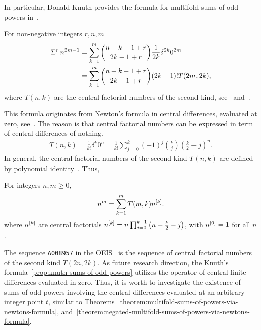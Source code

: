 In particular, Donald Knuth provides the formula for multifold sums of
odd powers in~\cite{knuth1993johann}.
\begin{proposition}
  For non-negative integers $r,n,m$
  \label{prop:knuth-sums-of-odd-powers}
  \begin{align*}
    \Sigma^{r}\,{n}^{2m-1}
    &= \sum_{k=1}^{m} \binom{n+k-1+r}{2k-1+r} \frac{1}{2k} \delta^{2k} 0^{2m} \\
    &= \sum_{k=1}^{m} \binom{n+k-1+r}{2k-1+r} (2k-1)! T(2m, 2k),
  \end{align*}
  where $T(n,k)$ are the central factorial numbers of the second
  kind, see~\cite[section 58]{steffensen1927interpolation}
  and~\cite[formula (10a)]{carlitz1963divided}.
\end{proposition}
This formula originates from Newton's formula in central differences,
evaluated at zero, see~\cite{kolosov_2025_18098442}.
The reason is that central factorial numbers can be expressed in
term of central differences of nothing.
\begin{align*}
  T(n, k) = \frac{1}{k!} \delta^k 0^n = \frac{1}{k!}
  \sum_{j=0}^{k} (-1)^j \binom{k}{j} \left( \frac{k}{2} - j \right)^n.
\end{align*}
In general, the
central factorial numbers of the second kind $T(n,k)$ are defined by polynomial
identity~\cite[ch. 6.5, formula (24)]{riordan1968combinatorial}.
Thus,
\begin{lemma} 
  For integers $n,m \geq 0$,
  \begin{align*}
    n^m = \sum_{k=1}^{m} T(m,k) n^{[k]}.
  \end{align*}
  where $n^{[k]}$ are central factorials
  $n^{[k]}
  = n \prod_{j=0}^{k-1} \left( n + \frac{k}{2} -j \right)$,
  with $n^{[0]}=1$ for all $n$.
\end{lemma}
The sequence
\href{https://oeis.org/A008957}{\texttt{A008957}}
in the OEIS~\cite{sloane2003line} is the sequence of
central factorial numbers of the second kind $T(2n,2k)$.
As future research direction,
the Knuth's formula~\eqref{prop:knuth-sums-of-odd-powers} utilizes the operator
of central finite differences evaluated in zero.
Thus, it is worth to investigate the existence of sums of odd powers involving
the central differences
evaluated at an arbitrary integer point $t$,
similar to Theorems~\eqref{theorem:multifold-sums-of-powers-via-newtons-formula},
and~\eqref{theorem:negated-multifold-sums-of-powers-via-newtons-formula}.
